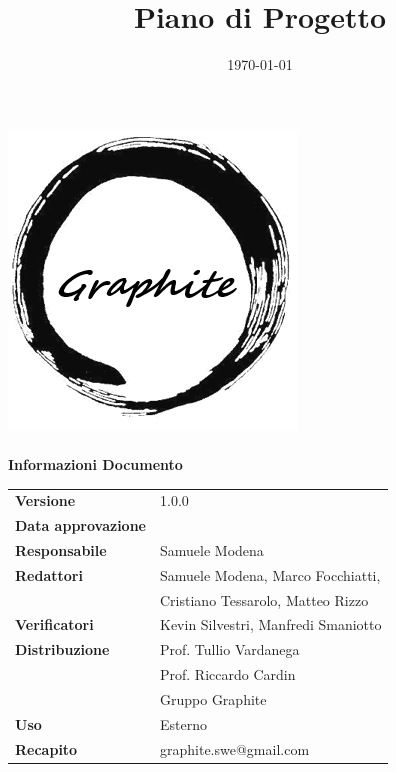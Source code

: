 \documentclass[openany,12pt,a4paper]{report}
\title{Piano di Progetto}
\author{}
\date{\today}
\newcommand{\versione}{1.0.0}
\begin{document}
	\makeatletter
	\begin{titlepage}
		\setlength{\headsep}{0pt}  
		\begin{center}
			\includegraphics[width=0.5\linewidth]{logo.png}\\[1em]
			{\huge \bfseries  \@title }\\[10ex]
			\textbf{\Large Informazioni Documento} \\[2em]
			\bgroup
			\def\arraystretch{1.5}
			\begin{tabular}{l|l}
				\textbf{Versione} & \versione{}  \\
				\textbf{Data approvazione} & \large \@date \\
				\textbf{Responsabile} & Samuele Modena \\
				\textbf{Redattori} & Samuele Modena, Marco Focchiatti, \\ 
								   & Cristiano Tessarolo, Matteo Rizzo \\
				\textbf{Verificatori} & Kevin Silvestri, Manfredi Smaniotto \\
				\textbf{Distribuzione} & Prof. Tullio Vardanega \\
				 & Prof. Riccardo Cardin \\
				 & Gruppo Graphite \\
				\textbf{Uso} & Esterno \\
				\textbf{Recapito} & graphite.swe@gmail.com \\
			\end{tabular}
		\egroup
		\end{center}
	\end{titlepage}
	\makeatother

	\thispagestyle{empty}
	\newpage
	
	
	
	\tableofcontents
	\listoffigures
	\listoftables
	
	
	
	
	
\end{document}
